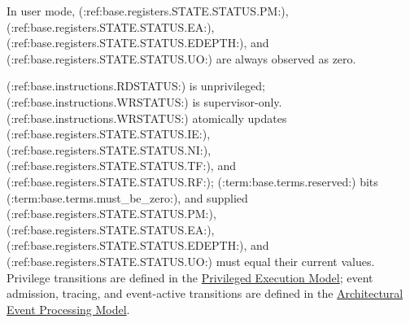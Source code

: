 In user mode, (:ref:base.registers.STATE.STATUS.PM:), (:ref:base.registers.STATE.STATUS.EA:), (:ref:base.registers.STATE.STATUS.EDEPTH:), and (:ref:base.registers.STATE.STATUS.UO:) are always observed as zero.

(:ref:base.instructions.RDSTATUS:) is unprivileged; (:ref:base.instructions.WRSTATUS:) is
supervisor-only. (:ref:base.instructions.WRSTATUS:) atomically updates (:ref:base.registers.STATE.STATUS.IE:), (:ref:base.registers.STATE.STATUS.NI:), (:ref:base.registers.STATE.STATUS.TF:), and (:ref:base.registers.STATE.STATUS.RF:);
(:term:base.terms.reserved:) bits (:term:base.terms.must_be_zero:), and supplied (:ref:base.registers.STATE.STATUS.PM:), (:ref:base.registers.STATE.STATUS.EA:), (:ref:base.registers.STATE.STATUS.EDEPTH:), and (:ref:base.registers.STATE.STATUS.UO:) must equal
their current values. Privilege
transitions are defined in the \hyperref[page:privileged-execution-model]{Privileged Execution Model}; event
admission, tracing, and event-active transitions are defined in the
\hyperref[page:architectural-event-processing-model]{Architectural Event Processing Model}.
